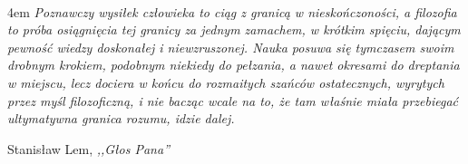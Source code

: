 \documentclass[11pt, a4paper, twoside]{Thesis} %
\title{\ttitle} %
\begin{document}

\frontmatter %

\fancyhead{} %
\fancyhead[LE,RO]{\thepage} %
\fancyhead[LO,RE]{} %

\pagestyle{fancy} %

\newcommand{\HRule}{\rule{\linewidth}{0.5mm}} %



\hypersetup{pdfsubject=\subjectname}
\hypersetup{pdfauthor=\authornames}
\hypersetup{pdfkeywords=\keywordnames}

\maketitle

\clearpage %


\cleardoublepage %
\thispagestyle{plain}
\ \\[0.3\textheight]
\begingroup
{}
\leftskip4em
\textit{\phantom{aaaa} Poznawczy wysi\l{}ek cz\l{}owieka to ci\k{a}g z granic\k{a} w niesko\'nczoności, a filozofia to pr\'oba osi\k{a}gnięcia tej granicy za jednym zamachem, w kr\'otkim spięciu, daj\k{a}cym pewność wiedzy doskona\l{}ej i niewzruszonej. Nauka posuwa się tymczasem swoim drobnym krokiem, podobnym niekiedy do pe\l{}zania, a nawet okresami do dreptania w miejscu, lecz dociera w ko\'ncu do rozmaitych sza\'nc\'ow ostatecznych, wyrytych przez myśl filozoficzn\k{a}, i nie bacz\k{a}c wcale na to, że tam w\l{}aśnie mia\l{}a przebiegać ultymatywna granica rozumu, idzie dalej.}
\begin{flushright}
  Stanis\l{}aw Lem, \textit{,,G\l{}os Pana''}  
\end{flushright}
\end{document}

